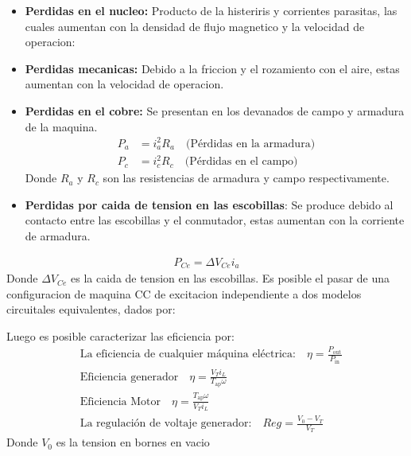 \documentclass[
  11pt,
  letterpaper,
   addpoints,
   answers
  ]{exam}
\begin{document}
\begin{itemize}
  \item \textbf{Perdidas en el nucleo:} Producto de la histeriris y corrientes parasitas, las cuales aumentan con la densidad de flujo magnetico y la velocidad de operacion:
  \item \textbf{Perdidas mecanicas:} Debido a la friccion y el rozamiento con el aire, estas aumentan con la velocidad de operacion.
  \item \textbf{Perdidas en el cobre:} Se presentan en los devanados de campo y armadura de la maquina.
  \begin{align}
    P_a &= i_a^2 R_a \quad \text{(Pérdidas en la armadura)} \\
    P_c &= i_c^2 R_c \quad \text{(Pérdidas en el campo)}
  \end{align}
  Donde $R_{a}$ y $R_{c}$ son las resistencias de armadura y campo respectivamente.
  \item \textbf{Perdidas por caida de tension en las escobillas}: Se produce debido al contacto entre las escobillas y el conmutador, estas aumentan con la corriente de armadura.
\end{itemize}

  \begin{align}
    P_{Ce} = \Delta V_{Ce} i_{a}
  \end{align}
  Donde $\Delta V_{Ce}$ es la caida de tension en las escobillas. Es posible el pasar de una configuracion de maquina CC de excitacion independiente a dos modelos circuitales equivalentes, dados por:
  \begin{figure}[H]
    \begin{center}
      \label{Figura-Ciudades}
    \end{center}
  \end{figure}  
Luego es posible caracterizar las eficiencia por:
\begin{align}
  &\text{La eficiencia de cualquier máquina eléctrica:} \quad \eta = \frac{P_{\text{out}}}{P_{\text{in}}} \\
  &\text{Eficiencia generador} \quad \eta = \frac{V_T i_L}{T_{\text{ap}}\omega} \\
  &\text{Eficiencia Motor} \quad \eta = \frac{T_{\text{ap}}\omega}{V_T i_L} \\
  &\text{La regulación de voltaje generador:} \quad Reg = \frac{V_0 - V_T}{V_T}
\end{align}
Donde $V_{0}$  es la tension en bornes en vacio
\end{document}

